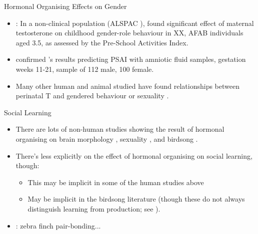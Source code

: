 \documentclass[hyperref={pdfpagelabels=false}]{beamer}
\begin{document}
\begin{frame}{Hormonal Organising Effects on Gender}
\begin{itemize}

	\item \citet{hinesetal2002}: In a non-clinical population (ALSPAC \citealt{alspac2001}), found significant effect of maternal testosterone on childhood gender-role behaviour in XX, AFAB individuals aged 3.5, as assessed by the Pre-School Activities Index.
	\item \citet{auyeungetal2009} confirmed \citet{hinesetal2002}'s results predicting PSAI with amniotic fluid samples, gestation weeks 11-21, sample of 112 male, 100 female.
	\item Many other human and animal studied have found relationships between perinatal T and gendered behaviour or sexuality \citep[see][for reviews]{cohenbendahanetal2005, hines2006, balthazart2011, hinesetal2015}.
\end{itemize}
\end{frame}

\begin{frame}{Social Learning}
\begin{itemize}
	\item There are lots of non-human studies showing the result of hormonal organising on brain morphology \citep[e.g. in rats, going back to][]{gorski1978}, sexuality \citep[many references in][Chapts. 3-4]{balthazart2011}, and birdsong \citep[see][for an overview]{balthazartetal2009}.
	\item There's less explicitly on the effect of hormonal organising on social learning, though:
		\begin{itemize}
		\item This may be implicit in some of the human studies above
		\item May be implicit in the birdsong literature (though these do not always distinguish learning from production; see \citealt{balthazartetal2009}).
		\end{itemize}
	\item \citet{mansukhanietal1996}: zebra finch pair-bonding...

\end{itemize}

\end{frame}
\end{document}
